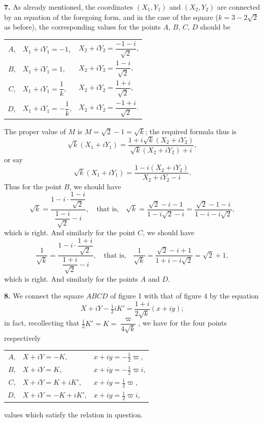 \documentclass[11pt,a4paper]{article}
\begin{document}
\textbf{7.} As already mentioned, the coordinates $(X_1, Y_1)$ and $(X_2, Y_2)$ are connected by an equation of the foregoing form, and in the case of the square ($k = 3 - 2\sqrt{2}$ as before), the corresponding values for the points $A$, $B$, $C$, $D$ should be
\begin{center}
\begin{tabular}{rll}
$A$, & $X_1 + i Y_1 = -1$, & $X_2 + i Y_2 = \dfrac{-1 - i}{\sqrt{2}}$,\\[6pt]
$B$, & $X_1 + i Y_1 = 1$, & $X_2 + i Y_2 = \dfrac{1 - i}{\sqrt{2}}$,\\[6pt]
$C$, & $X_1 + i Y_1 = \dfrac{1}{k}$, & $X_2 + i Y_2 = \dfrac{1 + i}{\sqrt{2}}$,\\[6pt]
$D$, & $X_1 + i Y_1 = -\dfrac{1}{k}$, & $X_2 + i Y_2 = \dfrac{-1 + i}{\sqrt{2}}$.\\
\end{tabular}
\end{center}
The proper value of $M$ is $M = \sqrt{2} - 1 = \sqrt{k}$; the required formula thus is
\[
\sqrt{k}(X_1 + i Y_1) = \frac{1 + i\sqrt{k}(X_2 + i Y_2)}{\sqrt{k}(X_2 + i Y_2) + i},
\]
or say
\[
\sqrt{k}(X_1 + i Y_1) = \frac{1 - i(X_2 + i Y_2)}{X_2 + i Y_2 - i}.
\]
Thus for the point $B$, we should have
\[
\sqrt{k} = \frac{1 - i\cdot\dfrac{1 - i}{\sqrt{2}}}{\dfrac{1 - i}{\sqrt{2}} - i}, \quad \text{that is,} \quad \sqrt{k} = \frac{\sqrt{2} - i - 1}{1 - i\sqrt{2} - i} = \frac{\sqrt{2} - 1 - i}{1 - i - i\sqrt{2}},
\]
which is right. And similarly for the point $C$, we should have
\[
\frac{1}{\sqrt{k}} = \frac{1 - i\cdot\dfrac{1 + i}{\sqrt{2}}}{\dfrac{1 + i}{\sqrt{2}} - i}, \quad \text{that is,} \quad \frac{1}{\sqrt{k}} = \frac{\sqrt{2} - i + 1}{1 + i - i\sqrt{2}} = \sqrt{2} + 1,
\]
which is right. And similarly for the points $A$ and $D$.

\textbf{8.} We connect the square $ABCD$ of figure 1 with that of figure 4 by the equation
\[
X + iY - \tfrac{1}{2}iK' = \frac{1 + i}{2\sqrt{k}}(x + iy);
\]
in fact, recollecting that $\tfrac{1}{2}K' = K = \dfrac{\varpi}{4\sqrt{k}}$, we have for the four points respectively
\begin{center}
\begin{tabular}{rll}
$A$, & $X + iY = -K$, & $x + iy = -\tfrac{1}{2}\varpi$,\\[3pt]
$B$, & $X + iY = K$, & $x + iy = -\tfrac{1}{2}\varpi i$,\\[3pt]
$C$, & $X + iY = K + i K'$, & $x + iy = \tfrac{1}{2}\varpi$,\\[3pt]
$D$, & $X + iY = -K + i K'$, & $x + iy = \tfrac{1}{2}\varpi i$,\\
\end{tabular}
\end{center}
values which satisfy the relation in question.
\end{document}
